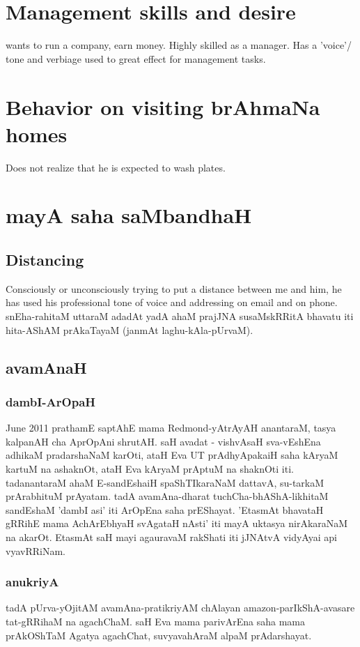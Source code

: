 \documentclass[oneside, article]{memoir}
\begin{document}
\section{Management skills and desire}
wants to run a company, earn money. Highly skilled as a manager. Has a 'voice'/ tone and verbiage used to great effect for management tasks.

\section{Behavior on visiting brAhmaNa homes}
Does not realize that he is expected to wash plates.

\section{mayA saha saMbandhaH}
\subsection{Distancing}
Consciously or unconsciously trying to put a distance between me and him, he has used his professional tone of voice and addressing on email and on phone. snEha-rahitaM uttaraM adadAt yadA ahaM prajJNA susaMskRRitA bhavatu iti hita-AShAM prAkaTayaM (janmAt laghu-kAla-pUrvaM).

\subsection{avamAnaH}
\subsubsection{dambI-ArOpaH}
June 2011 prathamE saptAhE mama Redmond-yAtrAyAH anantaraM, tasya kalpanAH cha AprOpAni shrutAH. saH avadat - vishvAsaH sva-vEshEna adhikaM pradarshaNaM karOti, ataH Eva UT prAdhyApakaiH saha kAryaM kartuM na ashaknOt, ataH Eva kAryaM prAptuM na shaknOti iti. tadanantaraM ahaM E-sandEshaiH spaShTIkaraNaM dattavA, su-tarkaM prArabhituM prAyatam. tadA avamAna-dharat tuchCha-bhAShA-likhitaM sandEshaM 'dambI asi' iti ArOpEna saha prEShayat. 'EtasmAt bhavataH gRRihE mama AchArEbhyaH svAgataH nAsti' iti mayA uktasya nirAkaraNaM na akarOt. EtasmAt saH mayi agauravaM rakShati iti jJNAtvA vidyAyai api vyavRRiNam.

\subsubsection{anukriyA}
tadA pUrva-yOjitAM avamAna-pratikriyAM chAlayan amazon-parIkShA-avasare tat-gRRihaM na agachChaM. saH Eva mama parivArEna saha mama prAkOShTaM Agatya agachChat, suvyavahAraM alpaM prAdarshayat.
\end{document}
